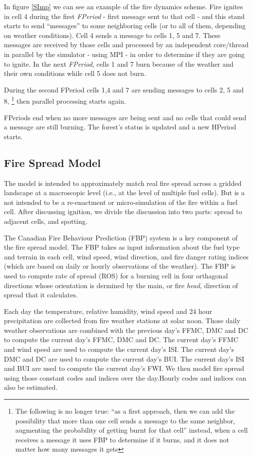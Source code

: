 \documentclass[11pt]{article}
\begin{document}
In figure \ref{SImp} we can see an example of the fire dynamics
scheme. Fire ignites in cell 4 during the first \textit{FPeriod } -
first message sent to that cell - and this stand starts to send
``messages'' to some neighboring cells (or to all of them, depending
on weather conditions). Cell 4 sends a message to cells 1, 5 and
7. These messages are received by those cells and processed by an
independent core/thread in parallel by the simulator - using MPI - in
order to determine if they are going to ignite. In the next
\textit{FPeriod}, cells 1 and 7 burn because of the weather and
their own conditions while cell 5 does not burn. 

During the second FPeriod cells 1,4 and 7 are sending messages to cells 2,
5 and 8, \footnote{The following is no longer true: ``as a first approach, then we can add the possibility that
more than one cell sends a message to the same neighbor, augmenting
the probability of getting burnt for that cell'' instead, when a cell
receives a message it uses FBP to determine if it burns, and it does not
matter how many messages it gets} then parallel
processing starts again.\

FPeriods end when no more messages are being sent and no cells that could
send a message are still burning.
The forest's status is updated and a new HPeriod starts.

\subsection{Fire Spread Model}

The model is intended to approximately match real fire spread across a
gridded landscape at a macroscopic level (i.e., at the level of
multiple fuel cells). But is a not intended to be a re-enactment or
micro-simulation of the fire within a fuel cell. After discussing
ignition, we divide the discussion into two parts: spread to adjacent
cells, and spotting.

The Canadian Fire Behaviour Prediction (FBP)
system is a key component of the fire spread model. The FBP takes as
input information about the fuel type and terrain in each cell, wind
speed, wind direction, and fire danger rating indices (which are based
on daily or hourly observations of the weather). The FBP is used to
compute rate of spread (ROS) for a burning cell in four orthagonal
directions whose orientation is dermined by the main, or fire {\em
  head}, direction of spread that it calculates.

Each day the temperature, relative humidity, wind speed and 24 hour
precipitation are collected from fire weather stations at solar noon.  Those daily
weather observations are combined with the previous day's FFMC, DMC
and DC to compute the current day's FFMC, DMC and DC.  The current
day's FFMC and wind speed are used to compute the current day's ISI.
The current day's DMC and DC are used to compute the current day's
BUI.  The current day's ISI and BUI are used to compute the current
day's FWI.  We then model fire spread using those constant codes
and indices over the day.Hourly codes and indices can also be estimated.
\end{document}
